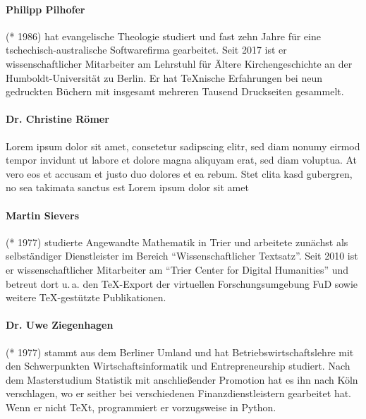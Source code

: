 \paragraph{Philipp Pilhofer} (* 1986) hat evangelische Theologie studiert und fast zehn Jahre für eine tschechisch-australische Softwarefirma gearbeitet. Seit 2017 ist er wissenschaftlicher Mitarbeiter am Lehrstuhl für Ältere Kirchengeschichte an der Humboldt-Universität zu Berlin. Er hat \TeX{}nische Erfahrungen bei neun gedruckten Büchern mit insgesamt mehreren Tausend Druckseiten gesammelt.

\paragraph{Dr. Christine Römer} Lorem ipsum dolor sit amet, consetetur sadipscing elitr, sed diam nonumy eirmod tempor invidunt ut labore et dolore magna aliquyam erat, sed diam voluptua. At vero eos et accusam et justo duo dolores et ea rebum. Stet clita kasd gubergren, no sea takimata sanctus est Lorem ipsum dolor sit amet

\paragraph{Martin Sievers} (* 1977) studierte Angewandte Mathematik in Trier und arbeitete zunächst als selbständiger Dienstleister im Bereich \enquote{Wissenschaftlicher Textsatz}. Seit 2010 ist er wissenschaftlicher Mitarbeiter am \enquote{Trier Center for Digital Humanities} und betreut dort u.\,a. den \TeX-Export der virtuellen Forschungsumgebung FuD sowie weitere \TeX-gestützte Publikationen.

\paragraph{Dr. Uwe Ziegenhagen} (* 1977) stammt aus dem Berliner Umland und hat Betriebswirtschaftslehre mit den Schwerpunkten Wirtschaftsinformatik und Entrepreneurship studiert. Nach dem Masterstudium Statistik mit anschließender Promotion hat es ihn nach Köln verschlagen, wo er seither bei verschiedenen Finanzdienstleistern gearbeitet hat. Wenn er nicht \TeX t, programmiert er vorzugsweise in Python.